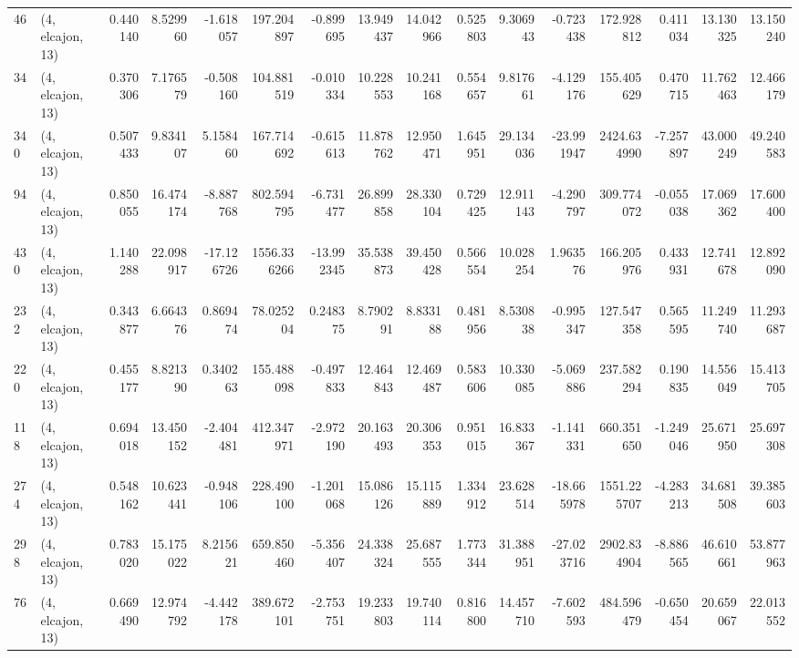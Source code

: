 \begin{tabular}{llrrrrrrrrrrrrrr}
46  &  (4, elcajon, 13) &   0.440140 &   8.529960 &  -1.618057 &   197.204897 &  -0.899695 &  13.949437 &  14.042966 &  0.525803 &   9.306943 &  -0.723438 &   172.928812 &  0.411034 &  13.130325 &  13.150240 \\
34  &  (4, elcajon, 13) &   0.370306 &   7.176579 &  -0.508160 &   104.881519 &  -0.010334 &  10.228553 &  10.241168 &  0.554657 &   9.817661 &  -4.129176 &   155.405629 &  0.470715 &  11.762463 &  12.466179 \\
340 &  (4, elcajon, 13) &   0.507433 &   9.834107 &   5.158460 &   167.714692 &  -0.615613 &  11.878762 &  12.950471 &  1.645951 &  29.134036 & -23.991947 &  2424.634990 & -7.257897 &  43.000249 &  49.240583 \\
94  &  (4, elcajon, 13) &   0.850055 &  16.474174 &  -8.887768 &   802.594795 &  -6.731477 &  26.899858 &  28.330104 &  0.729425 &  12.911143 &  -4.290797 &   309.774072 & -0.055038 &  17.069362 &  17.600400 \\
430 &  (4, elcajon, 13) &   1.140288 &  22.098917 & -17.126726 &  1556.336266 & -13.992345 &  35.538873 &  39.450428 &  0.566554 &  10.028254 &   1.963576 &   166.205976 &  0.433931 &  12.741678 &  12.892090 \\
232 &  (4, elcajon, 13) &   0.343877 &   6.664376 &   0.869474 &    78.025204 &   0.248375 &   8.790291 &   8.833188 &  0.481956 &   8.530838 &  -0.995347 &   127.547358 &  0.565595 &  11.249740 &  11.293687 \\
220 &  (4, elcajon, 13) &   0.455177 &   8.821390 &   0.340263 &   155.488098 &  -0.497833 &  12.464843 &  12.469487 &  0.583606 &  10.330085 &  -5.069886 &   237.582294 &  0.190835 &  14.556049 &  15.413705 \\
118 &  (4, elcajon, 13) &   0.694018 &  13.450152 &  -2.404481 &   412.347971 &  -2.972190 &  20.163493 &  20.306353 &  0.951015 &  16.833367 &  -1.141331 &   660.351650 & -1.249046 &  25.671950 &  25.697308 \\
274 &  (4, elcajon, 13) &   0.548162 &  10.623441 &  -0.948106 &   228.490100 &  -1.201068 &  15.086126 &  15.115889 &  1.334912 &  23.628514 & -18.665978 &  1551.225707 & -4.283213 &  34.681508 &  39.385603 \\
298 &  (4, elcajon, 13) &   0.783020 &  15.175022 &   8.215621 &   659.850460 &  -5.356407 &  24.338324 &  25.687555 &  1.773344 &  31.388951 & -27.023716 &  2902.834904 & -8.886565 &  46.610661 &  53.877963 \\
76  &  (4, elcajon, 13) &   0.669490 &  12.974792 &  -4.442178 &   389.672101 &  -2.753751 &  19.233803 &  19.740114 &  0.816800 &  14.457710 &  -7.602593 &   484.596479 & -0.650454 &  20.659067 &  22.013552 \\

\end{tabular}
